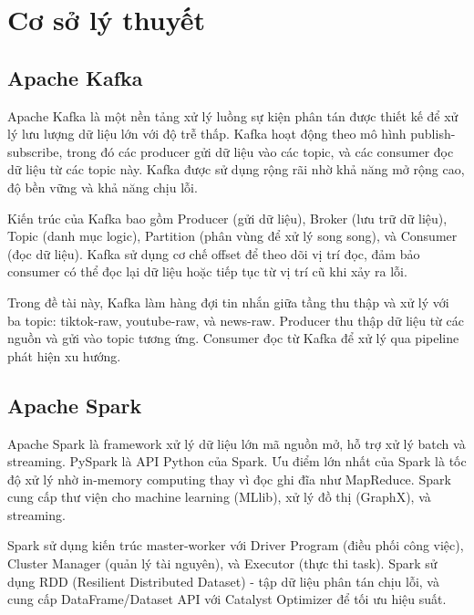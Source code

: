 
\chapter{Cơ sở lý thuyết}


\section{Apache Kafka}

Apache Kafka là một nền tảng xử lý luồng sự kiện phân tán được thiết kế để xử lý lưu lượng dữ liệu lớn với độ trễ thấp. Kafka hoạt động theo mô hình publish-subscribe, trong đó các producer gửi dữ liệu vào các topic, và các consumer đọc dữ liệu từ các topic này. Kafka được sử dụng rộng rãi nhờ khả năng mở rộng cao, độ bền vững và khả năng chịu lỗi.

Kiến trúc của Kafka bao gồm Producer (gửi dữ liệu), Broker (lưu trữ dữ liệu), Topic (danh mục logic), Partition (phân vùng để xử lý song song), và Consumer (đọc dữ liệu). Kafka sử dụng cơ chế offset để theo dõi vị trí đọc, đảm bảo consumer có thể đọc lại dữ liệu hoặc tiếp tục từ vị trí cũ khi xảy ra lỗi.

Trong đề tài này, Kafka làm hàng đợi tin nhắn giữa tầng thu thập và xử lý với ba topic: tiktok-raw, youtube-raw, và news-raw. Producer thu thập dữ liệu từ các nguồn và gửi vào topic tương ứng. Consumer đọc từ Kafka để xử lý qua pipeline phát hiện xu hướng.

\section{Apache Spark}

Apache Spark là framework xử lý dữ liệu lớn mã nguồn mở, hỗ trợ xử lý batch và streaming. PySpark là API Python của Spark. Ưu điểm lớn nhất của Spark là tốc độ xử lý nhờ in-memory computing thay vì đọc ghi đĩa như MapReduce. Spark cung cấp thư viện cho machine learning (MLlib), xử lý đồ thị (GraphX), và streaming.

Spark sử dụng kiến trúc master-worker với Driver Program (điều phối công việc), Cluster Manager (quản lý tài nguyên), và Executor (thực thi task). Spark sử dụng RDD (Resilient Distributed Dataset) - tập dữ liệu phân tán chịu lỗi, và cung cấp DataFrame/Dataset API với Catalyst Optimizer để tối ưu hiệu suất.

